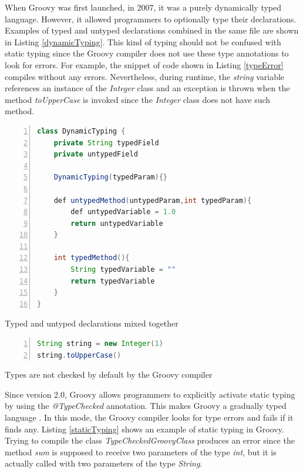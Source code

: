 \documentclass[msc]{ppgccufmg}
\begin{document}
When Groovy was first launched, in 2007, it was a purely dynamically typed language.
However, it allowed programmers to optionally type their declarations.
Examples of typed and untyped declarations combined in the same file are shown in Listing \ref{dynamicTyping}.
This kind of typing should not be confused with static typing since the Groovy compiler does not use these type annotations to look for errors.
For example, the snippet of code shown in Listing \ref{typeError} compiles without any errors.
Nevertheless, during runtime, the \emph{string} variable references an instance of the \emph{Integer} class and an exception is thrown when the method \emph{toUpperCase} is invoked since the \emph{Integer} class does not have such method.

\begin{Listing}[ht]
\begin{lstlisting}[basicstyle=\ttfamily, language=Java,tabsize=2,breaklines=true,numbers=left,morekeywords={def}]
class DynamicTyping {
	private String typedField
	private untypedField

	DynamicTyping(typedParam){}

	def untypedMethod(untypedParam,int typedParam){
		def untypedVariable = 1.0
		return untypedVariable
	}

	int typedMethod(){
		String typedVariable = ""
		return typedVariable
	}
}
\end{lstlisting}
\caption{Typed and untyped declarations mixed together}
\label{dynamicTyping}
\end{Listing}

\begin{Listing}[ht]
\begin{lstlisting}[basicstyle=\ttfamily, language=Java,tabsize=2,breaklines=true,numbers=left]
String string = new Integer(1)
string.toUpperCase()
\end{lstlisting}
\caption{Types are not checked by default by the Groovy compiler}
\label{typeError}
\end{Listing}

Since version 2.0, Groovy allows programmers to explicitly activate static typing by using the \emph{@TypeChecked} annotation.
This makes Groovy a gradually typed language \cite{gray05,gray08,gray11,siek07,takikawa12}.
In this mode, the Groovy compiler looks for type errors and fails if it finds any.
Listing \ref{staticTyping} shows an example of static typing in Groovy.
Trying to compile the class \emph{TypeCheckedGroovyClass} produces an error since the method \emph{sum} is supposed to receive two parameters of the type \emph{int}, but it is actually called with two parameters of the type \emph{String}.
\end{document}
